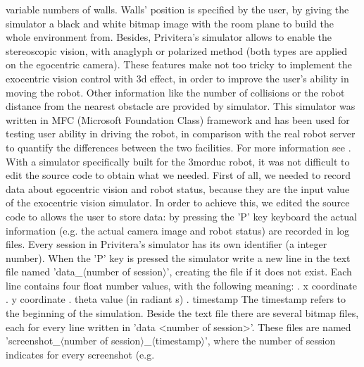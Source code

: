 variable numbers of walls. Walls' position is specified by the user, by giving the simulator a black and white bitmap image
with the room plane to build the whole environment from.
\newline Besides, Privitera's simulator allows to enable the stereoscopic vision, with anaglyph or polarized method (both 
types are applied on the egocentric camera). These features make not too tricky to implement the exocentric vision control with 3d
effect, in order to improve the user's ability in moving the robot. Other information like the number of collisions or the robot
distance from the nearest obstacle are provided by simulator.
\newline This simulator was written in MFC (Microsoft Foundation Class) framework and has been used for testing user ability in
driving the robot, in comparison with the real robot server to quantify the differences between the two facilities. For more
information see \cite{privitera}.
\newline With a simulator specifically built for the 3morduc robot, it was not difficult to edit the source code to obtain what we 
needed. First of all, we needed to record data about egocentric vision and robot status, because they are the input value 
of the exocentric vision simulator. In order to achieve this, we edited the source code to allows the user to store data: by
pressing the 'P' key keyboard the actual information (e.g. the actual camera image and robot status) are recorded in
log files.
\newline Every session in Privitera's simulator has its own identifier (a integer number). When the 'P' key is pressed the
simulator write a new line in the text file named 'data\_$\langle$number of session$\rangle$', creating the file if it does
not exist. Each line contains four float number values, with the following meaning:
\newline
{}. x coordinate
. y coordinate
. theta value (in radiant s)
. timestamp
\newline 
\newline The timestamp refers to the beginning of the simulation.
\newline Beside the text file there are several bitmap files, each for every line written in 'data <number of session>'. These 
files are named 'screenshot\_$\langle$number of session$\rangle$\_$\langle$timestamp$\rangle$', where the number of session indicates for every screenshot (e.g.
